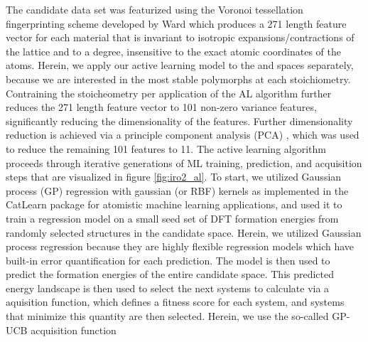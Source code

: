 %
The candidate data set was featurized using the Voronoi tessellation fingerprinting scheme developed by Ward  \cite{Ward2017} which produces a 271 length feature vector for each material that is invariant to isotropic expansions/contractions of the lattice and to a degree, insensitive to the exact atomic coordinates of the atoms.
%
Herein, we apply our active learning model to the \IrOtwo and \IrOthree spaces separately, because we are interested in the most stable polymorphs at each stoichiometry.
%
Contraining the stoicheometry per application of the AL algorithm further reduces the 271 length  feature vector to 101 non-zero variance features,
significantly reducing the dimensionality of the features.
%
Further dimensionality reduction is achieved via a principle component analysis (PCA) \cite{Tipping1999}, which was used to reduce the remaining 101 features to 11.
%
The active learning algorithm proceeds through iterative generations of ML training, prediction, and acquisition steps that are visualized in figure \ref{fig:iro2_al}.
%
To start, we utilized Gaussian process (GP) regression with gaussian (or RBF) kernels as implemented in the CatLearn\cite{hansen2019atomistic,CatLearn_Repo} package for atomistic machine learning applications, and used it to train a regression model on a small seed set of DFT formation energies from randomly selected structures in the candidate space.
%
Herein, we utilized Gaussian process regression because they are highly flexible regression models which have built-in error quantification for each prediction.
%
The model is then used to predict the formation energies of the entire candidate space.
%
This predicted energy landscape is then used to select the next systems to calculate via a aquisition function, which defines a fitness score for each system, and systems that minimize this quantity are then selected.
%
Herein, we use the so-called GP-UCB acquisition function
%
